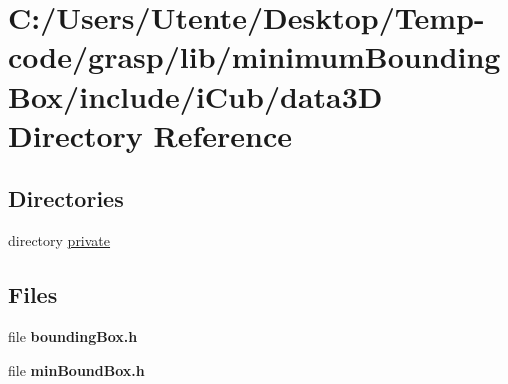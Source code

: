 \section{C\+:/\+Users/\+Utente/\+Desktop/\+Temp-\/code/grasp/lib/minimum\+Bounding\+Box/include/i\+Cub/data3\+D Directory Reference}
\label{dir_d1b40d230a761313a9d7cdc6cd113530}
\subsection*{Directories}
\begin{DoxyCompactItemize}
\item 
directory \hyperlink{dir_e13009e1a82525fbca9d8346584adffe}{private}
\end{DoxyCompactItemize}
\subsection*{Files}
\begin{DoxyCompactItemize}
\item 
file {\bfseries bounding\+Box.\+h}
\item 
file {\bfseries min\+Bound\+Box.\+h}
\end{DoxyCompactItemize}
